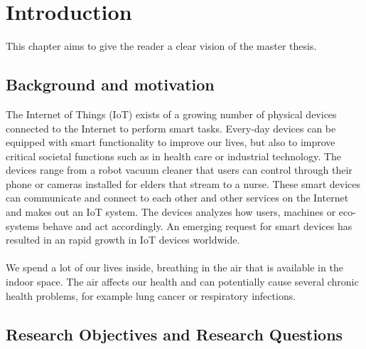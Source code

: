 \chapter*{Introduction}
This chapter aims to give the reader a clear vision of the master thesis.  
\section*{Background and motivation}
The Internet of Things (IoT) exists of a growing number of physical devices connected to the Internet to perform smart tasks. \cite{IoTSurveyAl-Fuqaha} Every-day devices can be equipped with smart functionality to improve our lives, but also to improve critical societal functions such as in health care or industrial technology. The devices range from a robot vacuum cleaner that users can control through their phone or cameras installed for elders that stream to a nurse. These smart devices can communicate and connect to each other and other services on the Internet and makes out an IoT system. The devices analyzes how users, machines or eco-systems behave and act accordingly. An emerging request for smart devices has resulted in an rapid growth in IoT devices worldwide. %
\\\\
We spend a lot of our lives inside, breathing in the air that is available in the indoor space. \cite{IndoorAirQualityMonitorIoT} The air affects our health and can potentially cause several chronic health problems, for example lung cancer or respiratory infections. \cite{IAQMonitorReview} 

\section*{Research Objectives and Research Questions}

